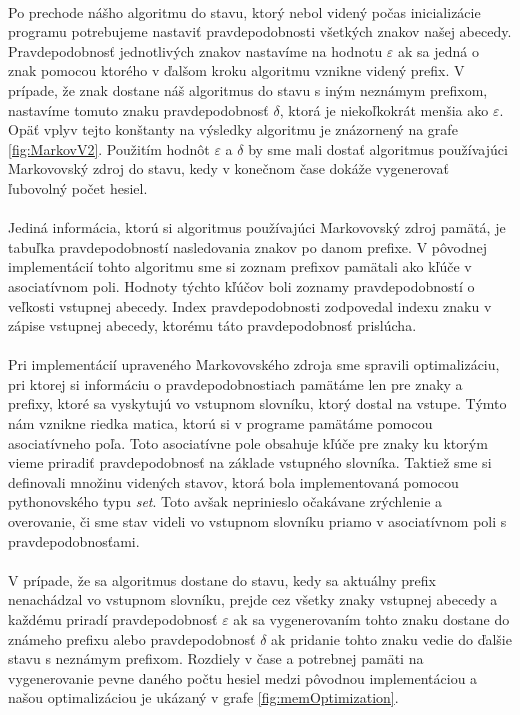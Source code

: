 \paragraph{}
Po prechode nášho algoritmu do stavu, ktorý nebol videný počas inicializácie programu potrebujeme nastaviť pravdepodobnosti všetkých znakov našej abecedy. Pravdepodobnosť jednotlivých znakov nastavíme na hodnotu \(\varepsilon\) ak sa jedná o znak pomocou ktorého v ďalšom kroku algoritmu vznikne videný prefix. V prípade, že znak dostane náš algoritmus do stavu s iným neznámym prefixom, nastavíme tomuto znaku pravdepodobnosť \(\delta\), ktorá je niekoľkokrát menšia ako \(\varepsilon\). Opäť vplyv tejto konštanty na výsledky algoritmu je znázornený na grafe \ref{fig:MarkovV2}. Použitím hodnôt \(\varepsilon\) a \(\delta\) by sme mali dostať algoritmus používajúci Markovovský zdroj do stavu, kedy v konečnom čase dokáže vygenerovať ľubovolný počet hesiel.

\paragraph{}
Jediná informácia, ktorú si algoritmus používajúci Markovovský zdroj pamätá, je tabuľka pravdepodobností nasledovania znakov po danom prefixe. V pôvodnej implementácií tohto algoritmu sme si zoznam prefixov pamätali ako kľúče v asociatívnom poli. Hodnoty týchto kľúčov boli zoznamy pravdepodobností o veľkosti vstupnej abecedy. Index pravdepodobnosti zodpovedal indexu znaku v zápise vstupnej abecedy, ktorému táto pravdepodobnosť prislúcha.

\paragraph{}
Pri implementácií upraveného Markovovského zdroja sme spravili optimalizáciu, pri ktorej si informáciu o pravdepodobnostiach pamätáme len pre znaky a prefixy, ktoré sa vyskytujú vo vstupnom slovníku, ktorý dostal na vstupe. Týmto nám vznikne riedka matica, ktorú si v programe pamätáme pomocou asociatívneho poľa. Toto asociatívne pole obsahuje kľúče pre znaky ku ktorým vieme priradiť pravdepodobnosť na základe vstupného slovníka. Taktiež sme si definovali množinu videných stavov, ktorá bola implementovaná pomocou pythonovského typu \emph{set}. Toto avšak neprinieslo očakávane zrýchlenie a overovanie, či sme stav videli vo vstupnom slovníku priamo v asociatívnom poli s pravdepodobnosťami.

\paragraph{}
V prípade, že sa algoritmus dostane do stavu, kedy sa aktuálny prefix nenachádzal vo vstupnom slovníku, prejde cez všetky znaky vstupnej abecedy a každému priradí pravdepodobnosť \(\varepsilon\) ak sa vygenerovaním tohto znaku dostane do známeho prefixu alebo pravdepodobnosť \(\delta\) ak pridanie tohto znaku vedie do ďalšie stavu s neznámym prefixom. Rozdiely v čase a potrebnej pamäti na vygenerovanie pevne daného počtu hesiel medzi pôvodnou implementáciou a našou optimalizáciou je ukázaný v grafe \ref{fig:memOptimization}.

